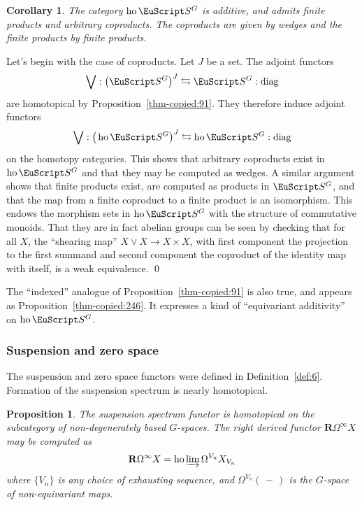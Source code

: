 \documentclass{amsart}
\newtheorem{cor}[equation]{Corollary}
\newtheorem{prop}[equation]{Proposition}
\theoremstyle{definition}
\theoremstyle{remark}
\newenvironment{pf}{\bigskip{\em Proof:\/}}{\qed\medskip}
\newcommand{\slot}{\,-\,}
\newcommand{\spectra}{\EuScript S}
\DeclareMathOperator{\ho}{ho}
\newcommand{\ugspectra}[1]{\spectra^{#1}}
\newcommand{\rder}{\mathbf{R}}
\begin{document}
\begin{cor}
\label{thm:90}
The category $\ho\ugspectra{G}$ is additive, and admits finite
products and arbitrary coproducts.  The coproducts are given by wedges
and the finite products by finite products.
\end{cor}

\begin{pf}
Let's begin with the case of coproducts.  Let $J$ be a set.  The
adjoint functors
\[
\bigvee:\big(\ugspectra{G}\big)^{J} \leftrightarrows \ugspectra{G}: \text{diag}
\]
are homotopical by Proposition~\ref{thm-copied:91}.  They therefore
induce adjoint functors 
\[
\bigvee:\big(\ho\ugspectra{G}\big)^{J} \leftrightarrows \ho\ugspectra{G}: \text{diag}
\]
on the homotopy categories.  This shows that arbitrary coproducts
exist in $\ho\ugspectra{G}$ and that they may be computed as wedges.
A similar argument shows that finite products exist, are computed as
products in $\ugspectra{G}$, and that the map from a finite coproduct
to a finite product is an isomorphism.  This endows the morphism sets
in $\ho\ugspectra{G}$ with the structure of commutative monoids.  That
they are in fact abelian groups can be seen by checking that for all
$X$, the ``shearing map'' $X\vee X\to X\times X$, with first component
the projection to the first summand and second component the coproduct
of the identity map with itself, is a weak equivalence.
\end{pf}

The ``indexed'' analogue of Proposition~\ref{thm-copied:91} is also
true, and appears as Proposition~\ref{thm-copied:246}.    It expresses
a kind of ``equivariant additivity'' on $\ho\ugspectra{G}$.


\subsubsection{Suspension and zero space}
\label{sec:susp-zero-space}

The suspension and zero space functors were defined in
Definition~\ref{def:6}.  Formation of the suspension spectrum is
nearly homotopical.

\begin{prop}
\label{thm:258} The suspension spectrum functor is homotopical on the
subcategory of non-degenerately based $G$-spaces.  The right derived
functor $\rder\Omega^{\infty}X$ may be computed as
\[
\rder\Omega^{\infty}X = \ho \varinjlim \Omega^{V_{n}}X_{V_{n}}
\]
where $\{V_{n}\}$ is any choice of exhausting sequence,
and $\Omega^{V_{n}}(\slot)$ is the $G$-space of non-equivariant maps.
\end{prop}
\end{document}
